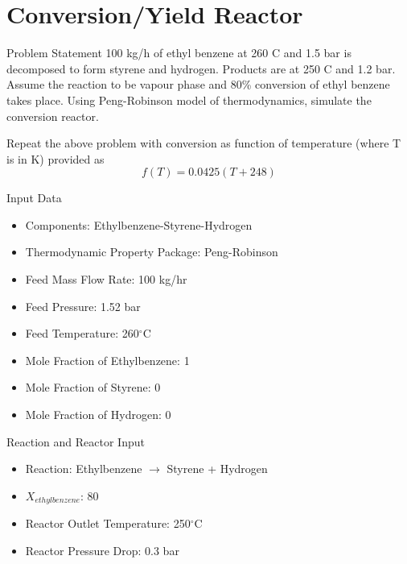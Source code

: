 \documentclass[10pt]{beamer}
\begin{document}
\section{Conversion/Yield Reactor}
\begin{frame}{Problem Statement}
100 kg/h of ethyl benzene at 260 \degree C and 1.5 bar is decomposed to form styrene and hydrogen. Products are at 250 \degree C and 1.2 bar. Assume the reaction to be vapour phase and 80\% conversion of ethyl benzene takes place. Using Peng-Robinson model of thermodynamics, simulate the conversion reactor.

\vspace{3ex}

Repeat the above problem with conversion as function of temperature (where T is in K) provided as 
\begin{equation*}
	f(T) = 0.0425(T+248)
\end{equation*}
\end{frame}

\begin{frame}{Input Data}
	\begin{itemize}
		\item Components: Ethylbenzene-Styrene-Hydrogen
		\item Thermodynamic Property Package: Peng-Robinson
		\item Feed Mass Flow Rate: 100 kg/hr
		\item Feed Pressure: 1.52 bar
		\item Feed Temperature: 260$^\circ$C
		\item Mole Fraction of Ethylbenzene: 1
		\item Mole Fraction of Styrene: 0
		\item Mole Fraction of Hydrogen: 0
	\end{itemize}
\end{frame}

\begin{frame}{Reaction and Reactor Input}
	\begin{itemize}
		\item Reaction: Ethylbenzene $\rightarrow$ Styrene + Hydrogen
		\item $X_{ethylbenzene}$: 80
		\item Reactor Outlet Temperature: 250$^\circ$C
		\item Reactor Pressure Drop: 0.3 bar
	\end{itemize}
\end{frame}
\end{document}
